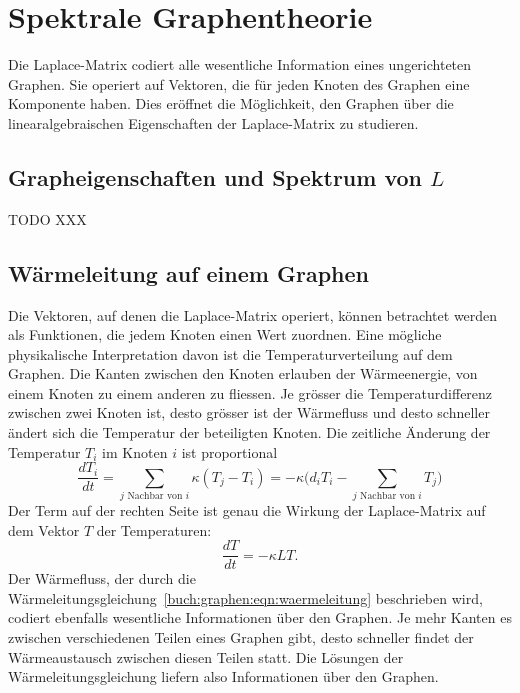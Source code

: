 %
%
%
\section{Spektrale Graphentheorie
\label{buch:section:spektrale-graphentheorie}}
Die Laplace-Matrix codiert alle wesentliche Information eines
ungerichteten Graphen.
Sie operiert auf Vektoren, die für jeden Knoten des Graphen eine
Komponente haben.
Dies eröffnet die Möglichkeit, den Graphen über die linearalgebraischen
Eigenschaften der Laplace-Matrix zu studieren.

\subsection{Grapheigenschaften und Spektrum von $L$
\label{buch:subsection:grapheigenschaften-und-spektrum-von-l}}
TODO XXX 

\subsection{Wärmeleitung auf einem Graphen
\label{buch:subsection:waermeleitung-auf-einem-graphen}}
Die Vektoren, auf denen die Laplace-Matrix operiert, können betrachtet
werden als Funktionen, die jedem Knoten einen Wert zuordnen.
Eine mögliche physikalische Interpretation davon ist die Temperaturverteilung
auf dem Graphen.
Die Kanten zwischen den Knoten erlauben der Wärmeenergie, von einem Knoten
zu einem anderen zu fliessen.
Je grösser die Temperaturdifferenz zwischen zwei Knoten ist, desto
grösser ist der Wärmefluss und desto schneller ändert sich die Temperatur
der beteiligten Knoten.
Die zeitliche Änderung der Temperatur $T_i$ im Knoten $i$ ist proportional
\[
\frac{dT_i}{dt}
=
\sum_{\text{$j$ Nachbar von $i$}} \kappa (T_j-T_i)
=
-
\kappa
\biggl(
d_iT_i
-
\sum_{\text{$j$ Nachbar von $i$}} T_j
\biggr)
\]
Der Term auf der rechten Seite ist genau die Wirkung der 
Laplace-Matrix auf dem Vektor $T$ der Temperaturen:
\begin{equation}
\frac{dT}{dt}
=
-\kappa L T.
\label{buch:graphen:eqn:waermeleitung}
\end{equation}
Der Wärmefluss, der durch die
Wärmeleitungsgleichung~\eqref{buch:graphen:eqn:waermeleitung} beschrieben
wird, codiert ebenfalls wesentliche Informationen über den Graphen.
Je mehr Kanten es zwischen verschiedenen Teilen eines Graphen gibt,
desto schneller findet der Wärmeaustausch zwischen diesen Teilen
statt.
Die Lösungen der Wärmeleitungsgleichung liefern also Informationen 
über den Graphen.

